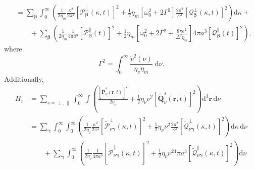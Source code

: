 \documentclass{article}
\begin{document}
\begin{equation}
\begin{split}
&= \sum_{\bm{\beta}}\int_0^\infty\left(\frac{1}{2\eta_m}\frac{\kappa^2}{2\pi^2}\left[\mathcal{P}_{\bm{\beta}}^\perp(\kappa,t)\right]^2 + \frac{1}{2}\eta_m\left[\omega_0^2 + 2\Gamma^2\right]\frac{2\pi^2}{\kappa^2}\left[\mathcal{Q}_{\bm{\beta}}^\perp(\kappa,t)\right]^2\right)\mathrm{d}\kappa + \\
&\qquad+ \sum_{\bm{\beta}}\left(\frac{1}{2\eta_m}\frac{1}{4\pi a^3}\left[\mathcal{P}_{\bm{\beta}}^\parallel(t)\right]^2 + \frac{1}{2}\eta_m\left[\omega_0^2 + 2\Gamma^2 + \frac{8\pi e^2}{\Delta^2\eta_m}\right]4\pi a^3\left[\mathcal{Q}_{\bm{\beta}}^\parallel(t)\right]^2\right),
\end{split}
\end{equation}
where
\begin{equation}
\Gamma^2 = \int_0^\infty\frac{\tilde{v}^2(\nu)}{\eta_\nu\eta_m}\;\mathrm{d}\nu.
\end{equation}
Additionally,
\begin{equation}
\begin{split}
H_r &= \sum_{s = \perp,\parallel}\int_0^\infty\int\left(\frac{\left[\tilde{\mathbf{P}}_\nu^s(\mathbf{r},t)\right]^2}{2\eta_\nu} + \frac{1}{2}\eta_\nu\nu^2\left[\tilde{\mathbf{Q}}_\nu^s(\mathbf{r},t)\right]^2\right)\mathrm{d}^3\mathbf{r}\,\mathrm{d}\nu\\
&= \sum_{\bm{\gamma}}\int_0^\infty\int_0^\infty\left(\frac{1}{2\eta_\nu}\frac{\kappa^2}{2\pi^2}\left[\tilde{\mathcal{P}}_{\nu\bm{\gamma}}^\perp(\kappa,t)\right]^2 + \frac{1}{2}\eta_\nu\nu^2\frac{2\pi^2}{\kappa^2}\left[\tilde{\mathcal{Q}}_{\nu\bm{\gamma}}^\perp(\kappa,t)\right]^2\right)\mathrm{d}\kappa\,\mathrm{d}\nu\\
&\qquad + \sum_{\bm{\gamma}}\int_0^\infty\left(\frac{1}{2\eta_\nu}\frac{1}{4\pi a^3}\left[\tilde{\mathcal{P}}_{\nu\bm{\gamma}}^\parallel(\kappa,t)\right]^2 + \frac{1}{2}\eta_\nu\nu^24\pi a^3\left[\tilde{\mathcal{Q}}_{\nu\bm{\gamma}}^\parallel(\kappa,t)\right]^2\right)\mathrm{d}\nu
\end{split}
\end{equation}
\end{document}
